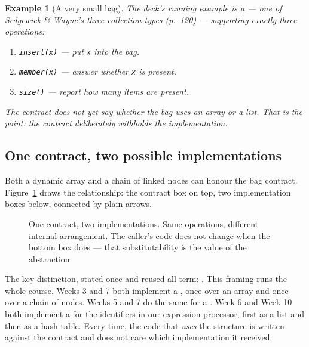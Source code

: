 \documentclass[11pt]{article}
\newtheorem{example}{Example}[section]
\begin{document}
\begin{example}[A very small bag]
The deck's running example is a  --- one of Sedgewick \&
Wayne's three collection types (p.~120) \cite{Sedgewick2011_algorithms} ---
supporting exactly three operations:
\begin{enumerate}
  \item \texttt{insert(x)} --- put \texttt{x} into the bag.
  \item \texttt{member(x)} --- answer whether \texttt{x} is present.
  \item \texttt{size()} --- report how many items are present.
\end{enumerate}
The contract does not yet say whether the bag uses an array or a list. That is
the point: the contract deliberately withholds the implementation.
\end{example}

\subsection{One contract, two possible implementations}

Both a dynamic array and a chain of linked nodes can honour the bag contract.
Figure~\ref{fig:adt} draws the relationship: the contract box on top, two
implementation boxes below, connected by plain arrows.

\begin{figure}[h]
  \centering
  \caption{One contract, two implementations. Same operations, different
  internal arrangement. The caller's code does not change when the bottom box
  does --- that substitutability is the value of the abstraction.}
  \label{fig:adt}
\end{figure}

The key distinction, stated once and reused all term: . This framing runs the whole course. Weeks 3
and 7 both implement a , once over an array and once over a chain of
nodes. Weeks 5 and 7 do the same for a . Week 6 and Week 10 both
implement a  for the identifiers in our expression processor,
first as a list and then as a hash table. Every time, the code that \emph{uses}
the structure is written against the contract and does not care which
implementation it received.
\end{document}

